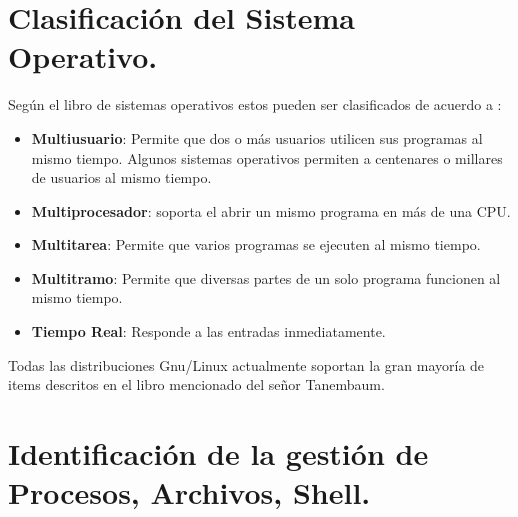 \documentclass[paper=a4, fontsize=12pt]{article} 		%
\numberwithin{equation}{section}						%
\numberwithin{table}{section} 							%
\begin{document}
\section{Clasificación del Sistema Operativo.}
Según el libro de sistemas operativos estos pueden ser clasificados de acuerdo a :
\begin{itemize}
\item\textbf{Multiusuario}: Permite que dos o más usuarios utilicen sus programas al mismo tiempo. Algunos sistemas operativos permiten a centenares o millares de usuarios al mismo tiempo.
\item\textbf{Multiprocesador}: soporta el abrir un mismo programa en más de una CPU.
\item\textbf{Multitarea}: Permite que varios programas se ejecuten al mismo tiempo.
\item\textbf{Multitramo}: Permite que diversas partes de un solo programa funcionen al mismo tiempo.
\item\textbf{Tiempo Real}: Responde a las entradas inmediatamente. 
\end{itemize}
Todas las distribuciones Gnu/Linux actualmente soportan la gran mayoría de items descritos en el libro mencionado del señor Tanembaum.
\section{Identificación de la gestión de Procesos, Archivos, Shell.}
\end{document}
